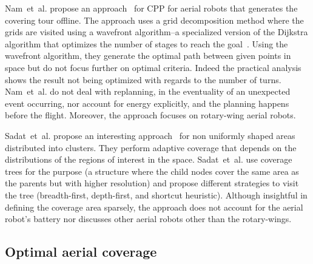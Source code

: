 Nam~et~al. propose an approach~\citep{nam2016approach} for CPP for aerial robots that generates the covering tour offline. The approach uses a grid decomposition method where the grids are visited using a wavefront algorithm--a specialized version of the Dijkstra algorithm that optimizes the number of stages to reach the goal~\citep{lavalle2006planning}. Using the wavefront algorithm, they generate the optimal path between given points in space but do not focus further on optimal criteria. Indeed the practical analysis shows the result not being optimized with regards to the number of turns. Nam~et~al. do not deal with replanning, in the eventuality of an unexpected event occurring, nor account for energy explicitly, and the planning happens before the flight. Moreover, the approach focuses on rotary-wing aerial robots. 

Sadat~et~al. propose an interesting approach~\citep{sadat2014recursive} for non uniformly shaped areas distributed into clusters. They perform adaptive coverage that depends on the distributions of the regions of interest in the space. Sadat~et~al. use coverage trees for the purpose (a structure where the child nodes cover the same area as the parents but with higher resolution) and propose different strategies to visit the tree (breadth-first, depth-first, and shortcut heuristic). Although insightful in defining the coverage area sparsely, the approach does not account for the aerial robot's battery nor discusses other aerial robots other than the rotary-wings.









\subsection{Optimal aerial coverage}
\label{sec:opti-aero-cov}

